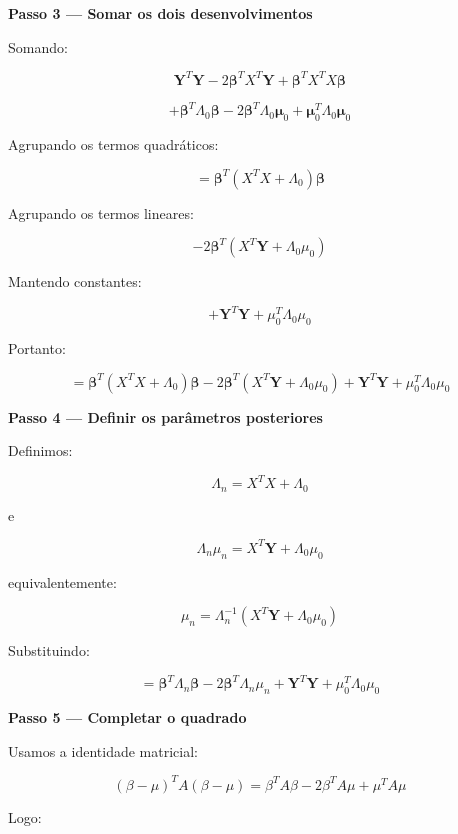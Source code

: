 \documentclass[12pt, a4paper]{article}
\begin{document}
\vspace{0.4cm}

\textbf{Passo 3 — Somar os dois desenvolvimentos}

Somando:

\[
\mathbf Y^T\mathbf Y
-
2\boldsymbol\beta^TX^T\mathbf Y
+
\boldsymbol\beta^TX^TX\boldsymbol\beta
\]

\[
+
\boldsymbol\beta^T\Lambda_0\boldsymbol\beta
-
2\boldsymbol\beta^T\Lambda_0\boldsymbol\mu_0
+
\boldsymbol\mu_0^T\Lambda_0\boldsymbol\mu_0
\]

Agrupando os termos quadráticos:

\[
=
\boldsymbol\beta^T
(X^TX+\Lambda_0)
\boldsymbol\beta
\]

Agrupando os termos lineares:

\[
-
2\boldsymbol\beta^T
(X^T\mathbf Y+\Lambda_0\mu_0)
\]

Mantendo constantes:

\[
+
\mathbf Y^T\mathbf Y
+
\mu_0^T\Lambda_0\mu_0
\]

Portanto:

\[
=
\boldsymbol\beta^T
(X^TX+\Lambda_0)
\boldsymbol\beta
-
2\boldsymbol\beta^T
(X^T\mathbf Y+\Lambda_0\mu_0)
+
\mathbf Y^T\mathbf Y
+
\mu_0^T\Lambda_0\mu_0
\]

\vspace{0.4cm}

\textbf{Passo 4 — Definir os parâmetros posteriores}

Definimos:

\[
\boxed{
\Lambda_n=X^TX+\Lambda_0
}
\]

e

\[
\boxed{
\Lambda_n\mu_n
=
X^T\mathbf Y+\Lambda_0\mu_0
}
\]

equivalentemente:

\[
\boxed{
\mu_n
=
\Lambda_n^{-1}
(X^T\mathbf Y+\Lambda_0\mu_0)
}
\]

Substituindo:

\[
=
\boldsymbol\beta^T
\Lambda_n
\boldsymbol\beta
-
2\boldsymbol\beta^T
\Lambda_n\mu_n
+
\mathbf Y^T\mathbf Y
+
\mu_0^T\Lambda_0\mu_0
\]

\vspace{0.4cm}

\textbf{Passo 5 — Completar o quadrado}

Usamos a identidade matricial:

\[
(\beta-\mu)^TA(\beta-\mu)
=
\beta^TA\beta
-
2\beta^TA\mu
+
\mu^TA\mu
\]

Logo:
\end{document}
